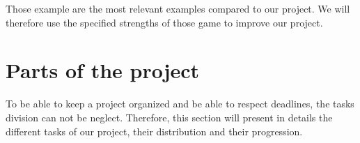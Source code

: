 \documentclass[12pt]{article}
\begin{document}
Those example are the most relevant examples compared to our project. We will therefore use the specified strengths of those game to improve our project.
\newpage

\section{Parts of the project}
To be able to keep a project organized and be able to respect deadlines, the tasks division can not be neglect. Therefore, this section will present in details the different tasks of our project, their distribution and their progression.\\[1.8cm]
\end{document}
